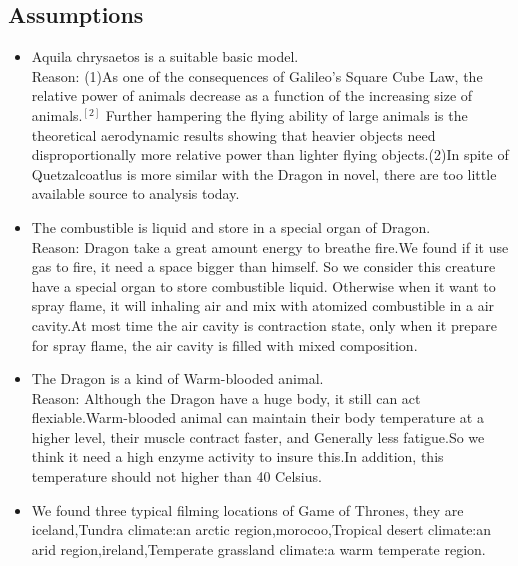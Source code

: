 \documentclass[12pt]{article}
\begin{document}
\subsection{Assumptions}%
\begin{itemize}
\item Aquila chrysaetos is a suitable basic model.\\
Reason: (1)As one of the consequences of Galileo’s Square Cube Law, the relative power of animals decrease as a function of the increasing size of animals.$^{[2]}$ Further hampering the flying ability of large animals is the theoretical aerodynamic results showing that heavier objects need disproportionally more relative power than lighter flying objects.(2)In spite of Quetzalcoatlus is more similar with the Dragon in novel, there are too little available source to analysis today.

\item The combustible is liquid and store in a special organ of Dragon.\\
Reason: Dragon take a great amount energy to breathe fire.We found if it use gas to fire, it need a space bigger than himself. So we consider this creature have a special organ to store combustible liquid. Otherwise  when it want to spray flame, it will inhaling air and mix with atomized combustible in a air cavity.At most time the air cavity is contraction state, only when it prepare for spray flame, the air cavity is filled with mixed composition.

\item The Dragon is a kind of Warm-blooded animal. \\
Reason: Although the Dragon have a huge body, it still can act flexiable.Warm-blooded animal can maintain their body temperature at a higher level, their muscle contract faster, and Generally less fatigue.So we think it need a high enzyme activity to insure this.In addition, this temperature should not higher than 40 Celsius.

\item We found three typical filming locations of Game of Thrones, they are iceland,Tundra climate:an arctic region,morocoo,Tropical desert climate:an arid region,ireland,Temperate grassland climate:a warm temperate region.

\end{itemize}
\end{document}
